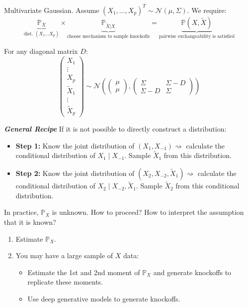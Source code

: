 \begin{example}{Multivariate Gaussian.}
Assume $(X_1, \dots, X_p)^T \sim \mathcal{N}(\mu, \Sigma)$. We require:
$$ \underbrace{\mathbb{P}_X}_{\text{dist. } (X_1 \dots X_p)} \times \underbrace{\mathbb{P}_{\tilde{X}|X}}_{\text{choose mechanism to sample knockoffs}} = \underbrace{\mathbb{P}(X, \tilde{X})}_{\text{pairwise exchangeability is satisfied}} $$

For any diagonal matrix $D$:
$$
\begin{pmatrix} X_1 \\ \vdots \\ X_p \\ \tilde{X}_1 \\ \vdots \\ \tilde{X}_p \end{pmatrix}
\sim \mathcal{N} \left( 
\begin{pmatrix} \mu \\ \mu \end{pmatrix}, 
\begin{pmatrix} \Sigma & \Sigma - D \\ \Sigma - D & \Sigma \end{pmatrix} 
\right)
$$
\end{example}
\emph{\textbf{General Recipe}}
If it is not possible to directly construct a distribution:
\begin{itemize}
    \item \textbf{Step 1:} Know the joint distribution of $(X_1, X_{-1}) \rightsquigarrow$ calculate the conditional distribution of $X_1 \mid X_{-1}$. Sample $\tilde{X}_1$ from this distribution.
    \item \textbf{Step 2:} Know the joint distribution of $(X_2, X_{-2}, \tilde{X}_1) \rightsquigarrow$ calculate the conditional distribution of $X_2 \mid X_{-2}, \tilde{X}_1$. Sample $\tilde{X}_2$ from this conditional distribution.
\end{itemize}

In practice, $\mathbb{P}_X$ is unknown. How to proceed? How to interpret the assumption that it is known?

\begin{enumerate}
    \item Estimate $\mathbb{P}_X$.
    \item You may have a large sample of $X$ data:
    \begin{itemize}
        \item Estimate the 1st and 2nd moment of $\mathbb{P}_X$ and generate knockoffs to replicate these moments.
        \item Use deep generative models to generate knockoffs.
    \end{itemize}
\end{enumerate}



